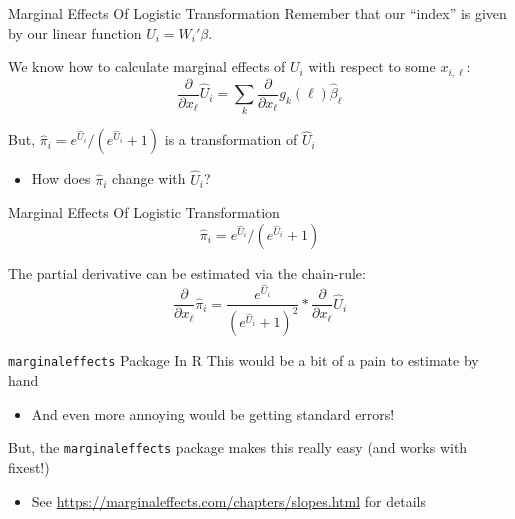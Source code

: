 \documentclass[aspectratio=169,t,11pt,table]{beamer}
\begin{document}
\begin{frame}{Marginal Effects Of Logistic Transformation}
  Remember that our ``index'' is given by our linear function $U_i = W_i' \beta$. 

  \bigskip
  We know how to calculate marginal effects of $U_i$ with respect to some $x_{i,\ell}$: 
  $$
    \frac{\partial}{\partial x_{\ell}} \hat{U}_i = \sum_k \frac{\partial}{\partial x_{\ell}} g_k(\ell) \hat{\beta}_\ell
  $$

  \pause
  \bigskip
  But, $\hat{\pi}_i = e^{\hat{U}_i} / ( e^{\hat{U}_i} + 1 )$ is a transformation of $\hat{U}_i$
  \begin{itemize}
    \item How does $\hat{\pi}_i$ change with $\hat{U}_i$?
  \end{itemize}
\end{frame}


\begin{frame}{Marginal Effects Of Logistic Transformation}
  \vspace*{-\bigskipamount}
  $$
    \hat{\pi}_i = e^{\hat{U}_i} / ( e^{\hat{U}_i} + 1 )
  $$
  
  \bigskip
  The partial derivative can be estimated via the chain-rule:
  $$
    \frac{\partial}{\partial x_{\ell}} \hat{\pi}_i =
    \frac{e^{\hat{U}_i}}{(e^{\hat{U}_i} + 1)^2} * 
    \frac{\partial}{\partial x_{\ell}} \hat{U}_i
  $$
\end{frame}

\begin{frame}{\texttt{marginaleffects} Package In R}
  This would be a bit of a pain to estimate by hand
  \begin{itemize}
    \item And even more annoying would be getting standard errors!
  \end{itemize}

  \bigskip
  But, the \texttt{marginaleffects} package makes this really easy (and works with fixest!)
  \begin{itemize}
    \item See \url{https://marginaleffects.com/chapters/slopes.html} for details
  \end{itemize}
\end{frame}
\end{document}
